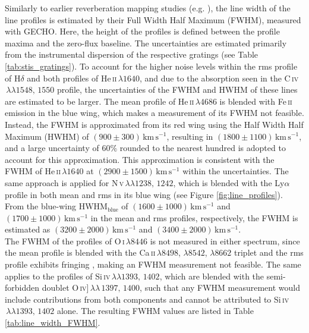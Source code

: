 Similarly to earlier reverberation mapping studies (e.g. \cite{kollatschny1997balmer, denney2006ngc4593, probst2025emissionlinecontinuumreverberationmapping}), the line width of the line profiles is estimated by their Full Width Half Maximum (FWHM), measured with GECHO. Here, the height of the profiles is defined between the profile maxima and the zero-flux baseline. The uncertainties are estimated primarily from the instrumental dispersion of the respective gratings (see Table \ref{tab:stis_gratings}). To account for the higher noise levels within the rms profile of H$\delta$ and both profiles of He\,\textsc{ii}$\,\lambda1640$, and due to the absorption seen in the C\,\textsc{iv}$\,\lambda\lambda 1548,\,1550$ profile, the uncertainties of the FWHM and HWHM of these lines are estimated to be larger. The mean profile of He\,\textsc{ii}$\,\lambda4686$ is blended with Fe\,\textsc{ii} emission in the blue wing, which makes a measurement of its FWHM not feasible. Instead, the FWHM is approximated from its red wing using the Half Width Half Maximum (HWHM) of $(900 \pm 300)\,\mathrm{km\,s^{-1}}$, resulting in $(1800 \pm 1100)\,\mathrm{km\,s^{-1}}$, and a large uncertainty of $60\%$ rounded to the nearest hundred is adopted to account for this approximation. This approximation is consistent with the FWHM of He\,\textsc{ii}$\,\lambda1640$ at $(2900 \pm 1500)\,\mathrm{km\,s^{-1}}$  within the uncertainties. The same approach is applied for N\,\textsc{v}$\,\lambda\lambda 1238,\,1242 $, which is blended with the Ly$\alpha$ profile in both mean and rms in its blue wing (see Figure \ref{fig:line_profiles}). From the blue-wing HWHM$_\mathrm{blue}$ of $(1600 \pm 1000)\,\mathrm{km\,s^{-1}}$ and $(1700 \pm 1000)\,\mathrm{km\,s^{-1}}$ in the mean and rms profiles, respectively, the FWHM is estimated as $(3200 \pm 2000)\,\mathrm{km\,s^{-1}}$ and $(3400 \pm 2000)\,\mathrm{km\,s^{-1}}$.\\
The FWHM of the profiles of O\,\textsc{i}$\,\lambda 8446$  is not measured in either spectrum, since the mean profile is blended with the Ca\,\textsc{ii}\,$\lambda8498$, $\lambda8542$, $\lambda8662$ triplet and the rms profile exhibits fringing \parencite{stisgratings}, making an FWHM measurement not feasible. The same applies to the profiles of Si\,\textsc{iv}$\,\lambda\lambda 1393,\,1402 $, which are blended with the semi-forbidden doublet O\,\textsc{iv}]$\,\lambda\lambda\,1397,\,1400$, such that any FWHM measurement would include contributions from both components and cannot be attributed to Si\,\textsc{iv}$\,\lambda\lambda 1393,\,1402 $ alone. The resulting FWHM values are listed in Table \ref{tab:line_width_FWHM}. \\
